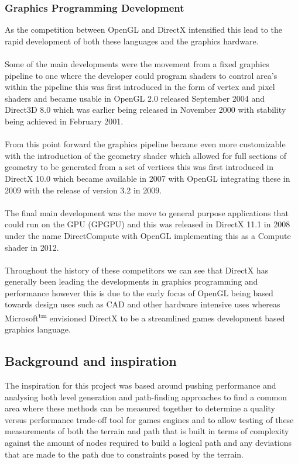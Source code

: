 \subsubsection{Graphics Programming Development}
As the competition between OpenGL and DirectX intensified this lead to the rapid development of both these languages and the graphics hardware.\\\\ Some of the main developments were the movement from a fixed graphics pipeline to one where the developer could program shaders to control area's within the pipeline this was first introduced in the form of vertex and pixel shaders and became usable in OpenGL 2.0 released September 2004\cite{OGLHistWiki} and Direct3D 8.0 which was earlier being released in November 2000 with stability being achieved in February 2001\cite{D3DHistWiki}.\\\\From this point forward the graphics pipeline became even more customizable with the introduction of the geometry shader which allowed for full sections of geometry to be generated from a set of vertices this was first introduced in DirectX 10.0 which became available in 2007 with OpenGL integrating these in 2009 with the release of version 3.2 in 2009.\\\\The final main development was the move to general purpose applications that could run on the GPU (GPGPU) and this was released in DirectX 11.1 in 2008 under the name DirectCompute with OpenGL implementing this as a Compute shader in 2012.\\\\ Throughout the history of these competitors we can see that DirectX has generally been leading the developments in graphics programming and performance however this is due to the early focus of OpenGL being based towards design uses such as CAD and other hardware intensive uses whereas Microsoft\textsuperscript{tm} envisioned DirectX to be a streamlined games development based graphics language.         
 
\subsection{Background and inspiration}
The inspiration for this project was based around pushing performance and analysing both level generation and path-finding approaches to find a common area where these methods can be measured together to determine a quality versus performance trade-off tool for games engines and to allow testing of these measurements of both the terrain and path that is built in terms of complexity against the amount of nodes required to build a logical path and any deviations that are made to the path due to constraints posed by the terrain. 

